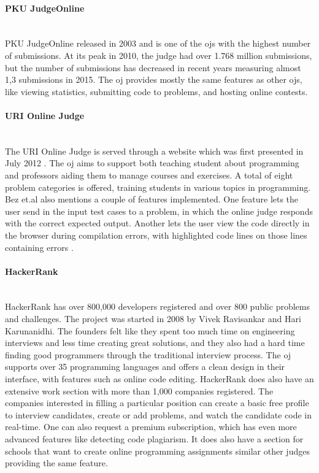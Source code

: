 \paragraph*{PKU JudgeOnline} \hfill \\
PKU JudgeOnline \cite{PKU} released in 2003 and is one of the \glspl{oj} with the highest number of submissions. At its peak in 2010, the judge had over 1.768 million submissions, but the number of submissions has decreased in recent years measuring almost 1,3 submissions in 2015. The \gls{oj} provides mostly the same features as other \glspl{oj}, like viewing statistics, submitting code to problems, and hosting online contests.

\paragraph*{URI Online Judge} \hfill \\
The URI Online Judge is served through a website which was first presented in July 2012 \cite{a:Bez2013}. The \gls{oj} aims to support both teaching student about programming and professors aiding them to manage courses and exercises. A total of eight problem categories is offered, training students in various topics in programming. Bez et.al also mentions a couple of features implemented. One feature lets the user send in the input test cases to a problem, in which the online judge responds with the correct expected output. Another lets the user view the code directly in the browser during compilation errors, with highlighted code lines on those lines containing errors \cite{a:Bez2013}.

\paragraph*{HackerRank} \hfill \\
HackerRank \cite{HACKERRANK} has over 800,000 developers registered and over 800 public problems and challenges. The project was started in 2008 by Vivek Ravisankar and Hari Karunanidhi. The founders felt like they spent too much time on engineering interviews and less time creating great solutions, and they also had a hard time finding good programmers through the traditional interview process. The \gls{oj} supports over 35 programming languages and offers a clean design in their interface, with features such as online code editing. HackerRank does also have an extensive work section with more than 1,000 companies registered. The companies interested in filling a particular position can create a basic free profile to interview candidates, create or add problems, and watch the candidate code in real-time. One can also request a premium subscription, which has even more advanced features like detecting code plagiarism. It does also have a section for schools that want to create online programming assignments similar other judges providing the same feature.

